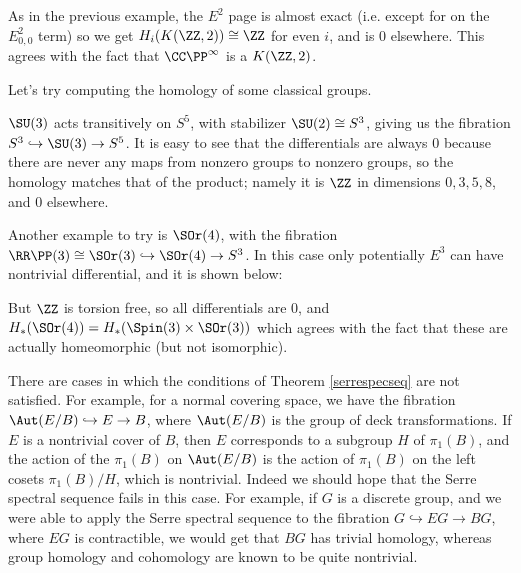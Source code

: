 \documentclass[12pt,oneside]{amsart}
\begin{document}
As in the previous example, the $E^2$ page is almost exact (i.e. except for on the $E^2_{0,0}$ term) so we get $H_i(K(\ZZ,2)) \cong \ZZ$ for even $i$, and is $0$ elsewhere. This agrees with the fact that $\CC\PP^\infty$ is a $K(\ZZ,2)$.

Let's try computing the homology of some classical groups.

$\SU(3)$ acts transitively on $S^5$, with stabilizer $\SU(2) \cong S^3$, giving us the fibration $S^3 \hookrightarrow \SU(3) \to S^5$.
It is easy to see that the differentials are always $0$ because there are never any maps from nonzero groups to nonzero groups, so the homology matches that of the product; namely it is $\ZZ$ in dimensions $0,3,5,8$, and $0$ elsewhere.

Another example to try is $\SOr(4)$, with the fibration $\RR\PP(3) \cong \SOr(3) \hookrightarrow \SOr(4) \to S^3$. In this case only potentially $E^3$ can have nontrivial differential, and it is shown below:

\begin{center}
\end{center}
But $\ZZ$ is torsion free, so all differentials are $0$, and $H_*(\SOr(4)) = H_*(\Spin(3)\times \SOr(3))$ which agrees with the fact that these are actually homeomorphic (but not isomorphic).

There are cases in which the conditions of Theorem \ref{serrespecseq} are not satisfied. For example, for a normal covering space, we have the fibration $\Aut(E/B) \hookrightarrow E \to B$, where $\Aut(E/B)$ is the group of deck transformations. If $E$ is a nontrivial cover of $B$, then $E$ corresponds to a subgroup $H$ of $\pi_1(B)$, and the action of the $\pi_1(B)$ on $\Aut(E/B)$ is the action of $\pi_1(B)$ on the left cosets $\pi_1(B)/H$, which is nontrivial. Indeed we should hope that the Serre spectral sequence fails in this case. For example, if $G$ is a discrete group, and we were able to apply the Serre spectral sequence to the fibration $G \hookrightarrow EG \to BG$, where $EG$ is contractible, we would get that $BG$ has trivial homology, whereas group homology and cohomology are known to be quite nontrivial.
\end{document}
